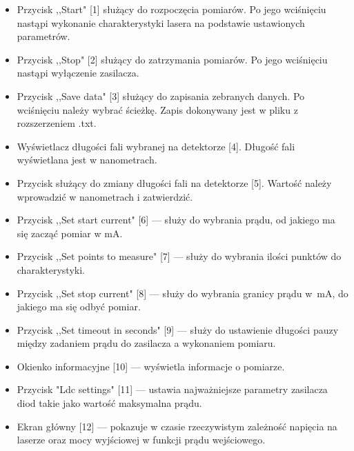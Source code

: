 \begin{itemize}
\item Przycisk ,,Start" [1] służący do rozpoczęcia pomiarów. Po jego wciśnięciu nastąpi wykonanie charakterystyki lasera na podstawie ustawionych parametrów.
\item Przycisk ,,Stop" [2] służący do zatrzymania pomiarów. Po jego wciśnięciu nastąpi wyłączenie zasilacza.
\item Przycisk ,,Save data" [3] służący do zapisania zebranych danych. Po wciśnięciu należy wybrać ścieżkę.
Zapis dokonywany jest w pliku z rozszerzeniem .txt.
\item Wyświetlacz długości fali wybranej na detektorze [4]. Długość fali wyświetlana jest w nanometrach.
\item Przycisk służący do zmiany długości fali na detektorze [5]. Wartość należy wprowadzić w nanometrach i zatwierdzić.
\item Przycisk ,,Set start current" [6] --- służy do wybrania prądu, od jakiego ma się zacząć pomiar w mA.
\item Przycisk ,,Set points to measure" [7] --- służy do wybrania ilości punktów do charakterystyki.
\item Przycisk ,,Set stop current" [8] --- służy do wybrania granicy prądu w \,mA, do jakiego ma się odbyć pomiar.
\item Przycisk ,,Set timeout in seconds" [9] --- służy do ustawienie długości pauzy między zadaniem prądu do zasilacza a wykonaniem pomiaru.
\item Okienko informacyjne [10] --- wyświetla informacje o pomiarze.
\item Przycisk "Ldc settings" [11] --- ustawia najważniejsze parametry zasilacza diod takie jako wartość maksymalna prądu.
\item Ekran główny [12] --- pokazuje w czasie rzeczywistym zależność napięcia na laserze oraz mocy wyjściowej w funkcji
prądu wejściowego.
\end{itemize}